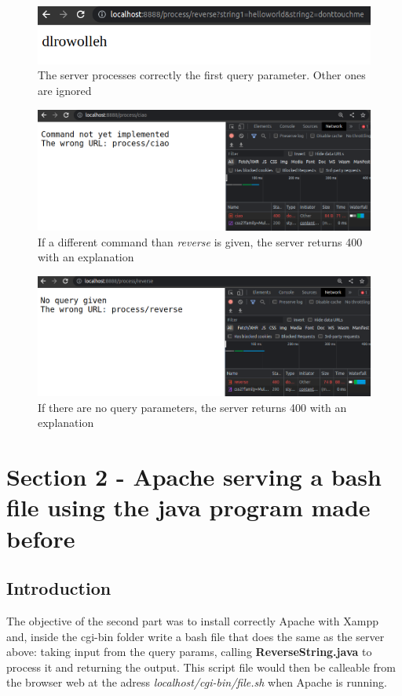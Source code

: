 \documentclass[12pt, a4paper]{article}
\begin{document}
  \begin{figure}[H]
    \centering
    \includegraphics[scale=0.6]{server_ok.png}
    \caption{The server processes correctly the first query parameter. Other ones are ignored}
  \end{figure}

  \begin{figure}[H]
    \centering
    \includegraphics[scale=0.4]{server_no_command.png}
    \caption{If a different command than \textit{reverse} is given, the server returns 400 with an explanation}
  \end{figure}  
  
  \begin{figure}[H]
    \centering
    \includegraphics[scale=0.4]{server_no_qeury.png}
    \caption{If there are no query parameters, the server returns 400 with an explanation}
  \end{figure}

  \section{Section 2 - Apache serving a bash file using the java program made before}
  \subsection{Introduction}
  The objective of the second part was to install correctly Apache with Xampp and, inside the cgi-bin folder write a bash file that does the same as the server above: taking input from the query params, calling \textbf{ReverseString.java} to process it and returning the output. This script file would then be calleable from the browser web at the adress \textit{localhost/cgi-bin/file.sh} when Apache is running.
\end{document}
